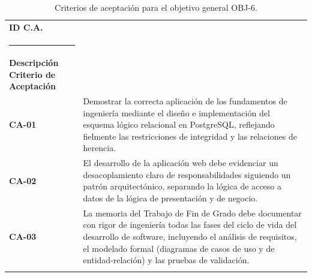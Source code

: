 \begin{table}[H]
	\centering
	\caption{Criterios de aceptación para el objetivo general OBJ-6.}
	\label{tab:criterios_aceptacion_normal06}
	\begin{tabularx}{\textwidth}{l X}
		\toprule
		\textbf{ID C.A.} & 
		\begin{minipage}[t]{\linewidth}
			\textbf{ID Objetivo asociado: OBJ-6 <Consolidación de competencias adquiridas>} \\[2pt]
			\rule{\linewidth}{0.4pt} \\[2pt]
			\textbf{Descripción Criterio de Aceptación}
		\end{minipage} \\
		\midrule
		\textbf{CA-01} & Demostrar la correcta aplicación de los fundamentos de ingeniería mediante el diseño e implementación del esquema lógico relacional en PostgreSQL, reflejando fielmente las restricciones de integridad y las relaciones de herencia. \\
		\addlinespace
		\textbf{CA-02} &  El desarrollo de la aplicación web debe evidenciar un desacoplamiento claro de responsabilidades siguiendo un patrón arquitectónico, separando la lógica de acceso a datos de la lógica de presentación y de negocio. \\
		\textbf{CA-03} & La memoria del Trabajo de Fin de Grado debe documentar con rigor de ingeniería todas las fases del ciclo de vida del desarrollo de software, incluyendo el análisis de requisitos, el modelado formal (diagramas de casos de uso y de entidad-relación) y las pruebas de validación.  \\
		\addlinespace
		\bottomrule
	\end{tabularx}	
\end{table}

